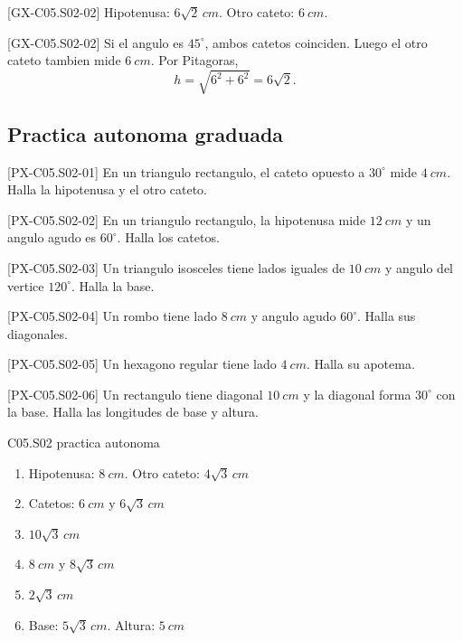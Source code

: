 \begin{shortanswer}{[GX-C05.S02-02]}
Hipotenusa: \(6\sqrt{2}\,\si{cm}\). Otro cateto: \(\SI{6}{cm}\).
\end{shortanswer}

\begin{fullsolution}{[GX-C05.S02-02]}
Si el angulo es \(45^\circ\), ambos catetos coinciden. Luego el otro cateto tambien mide
\(\SI{6}{cm}\). Por Pitagoras,
\[
h=\sqrt{6^2+6^2}=6\sqrt{2}.
\]
\end{fullsolution}

\subsection*{Practica autonoma graduada}
\begin{exercise}{[PX-C05.S02-01] En un triangulo rectangulo, el cateto opuesto a \(30^\circ\) mide \(\SI{4}{cm}\). Halla la hipotenusa y el otro cateto.}
\end{exercise}
\begin{exercise}{[PX-C05.S02-02] En un triangulo rectangulo, la hipotenusa mide \(\SI{12}{cm}\) y un angulo agudo es \(60^\circ\). Halla los catetos.}
\end{exercise}
\begin{exercise}{[PX-C05.S02-03] Un triangulo isosceles tiene lados iguales de \(\SI{10}{cm}\) y angulo del vertice \(120^\circ\). Halla la base.}
\end{exercise}
\begin{exercise}{[PX-C05.S02-04] Un rombo tiene lado \(\SI{8}{cm}\) y angulo agudo \(60^\circ\). Halla sus diagonales.}
\end{exercise}
\begin{exercise}{[PX-C05.S02-05] Un hexagono regular tiene lado \(\SI{4}{cm}\). Halla su apotema.}
\end{exercise}
\begin{exercise}{[PX-C05.S02-06] Un rectangulo tiene diagonal \(\SI{10}{cm}\) y la diagonal forma \(30^\circ\) con la base. Halla las longitudes de base y altura.}
\end{exercise}

\begin{shortanswer}{C05.S02 practica autonoma}
\begin{enumerate}[label=\textbf{PX-C05.S02-\arabic*:}, leftmargin=*]
  \item Hipotenusa: \(\SI{8}{cm}\). Otro cateto: \(4\sqrt{3}\,\si{cm}\)
  \item Catetos: \(\SI{6}{cm}\) y \(6\sqrt{3}\,\si{cm}\)
  \item \(10\sqrt{3}\,\si{cm}\)
  \item \(\SI{8}{cm}\) y \(8\sqrt{3}\,\si{cm}\)
  \item \(2\sqrt{3}\,\si{cm}\)
  \item Base: \(5\sqrt{3}\,\si{cm}\). Altura: \(\SI{5}{cm}\)
\end{enumerate}
\end{shortanswer}

